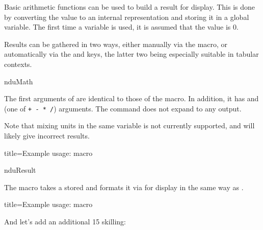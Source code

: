 \documentclass[
	a4paper,
	margin=4cm
]{article}
\begin{document}
Basic arithmetic functions can be used to build a result for display. This is done by converting the value to an internal representation and storing it in a global variable. The first time a variable is used, it is assumed that the value is 0.

Results can be gathered in two ways, either manually via the  macro, or automatically via the  and  keys, the latter two being especially suitable in tabular contexts.

\begin{docCommand}
	{nduMath}
	{}

	The first arguments of  are identical to those of the  macro. In addition, it has  and  (one of \texttt{+ - * /}) arguments. The command does not expand to any output.

	Note that mixing units in the same variable is not currently supported, and will likely give incorrect results.

\begin{dispExample*}{
	title=Example usage:  macro
}
\end{dispExample*}

\end{docCommand}

\begin{docCommand}
	{nduResult}
	{}

	The  macro takes a stored  and formats it via  for display in the same way as .

\begin{dispExample*}{
	title=Example usage:  macro
}

And let's add an additional 15 skilling:
\end{dispExample*}

\end{docCommand}
\end{document}
